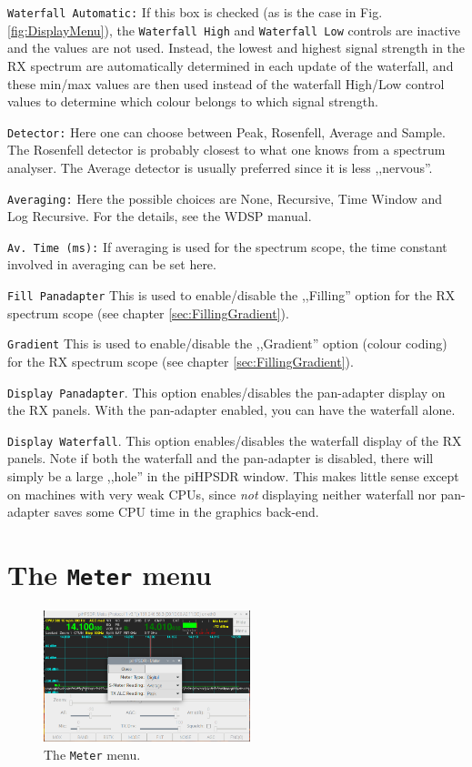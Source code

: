\documentclass[12pt]{book}
\def\rett#1{\texttt{\color{red}#1}}
\def\bltt#1{\texttt{\color{blue}#1}}
\def\pH{pi\-HPSDR\xspace}
\begin{document}
\rett{Waterfall Automatic:} If this box is checked (as is the case in
Fig. \ref{fig:DisplayMenu}), the \rett{Waterfall High} and
\rett{Waterfall Low} controls are inactive and the values are not used. Instead,
the lowest and highest signal strength in the RX spectrum are automatically determined
in each update of the waterfall, and these min/max values
 are then used instead of the waterfall High/Low control values to determine which
 colour belongs to which signal strength.

\rett{Detector:} Here one can choose between Peak, Rosenfell, Average and Sample. The
Rosenfell detector is probably closest to what one knows from a spectrum analyser.
The Average detector is usually preferred since it is less ,,nervous''.

\rett{Averaging:} Here the possible choices are None, Recursive, Time Window and
Log Recursive. For the details, see the WDSP manual.

\rett{Av. Time (ms):} If averaging is used for the spectrum scope, the time
constant involved in averaging can be set here.

\rett{Fill Panadapter} This is used to enable/disable the ,,Filling'' option
for the RX  spectrum scope (see chapter \ref{sec:FillingGradient}).

\rett{Gradient} This is used to enable/disable the ,,Gradient'' option
(colour coding) for the RX spectrum scope (see chapter \ref{sec:FillingGradient}).

\rett{Display Panadapter}. This option enables/disables the pan-adapter display
on the RX panels. With the pan-adapter enabled, you can have the waterfall alone.

 \rett{Display Waterfall}. This option enables/disables the waterfall display
 of the RX panels. Note if both the waterfall and the pan-adapter is disabled,
 there will simply be a large ,,hole'' in the \pH window. This makes little sense
 except on machines with very weak CPUs, since \textit{not} displaying neither waterfall
 nor pan-adapter saves some CPU time in the graphics back-end.


\section{The \texttt{Meter} menu}

\begin{figure}[ht]
\center
\includegraphics[width=6cm]{MeterMenu.png}
\caption{The \bltt{Meter} menu.}
\label{fig:Meter}
\end{figure}
\end{document}
